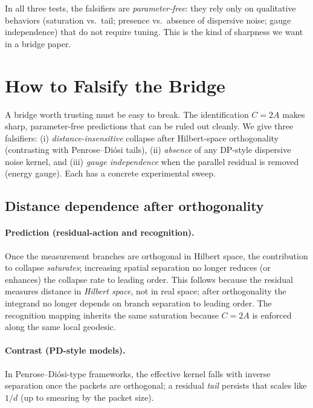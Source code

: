 \documentclass[11pt,letterpaper]{article}
\theoremstyle{definition}
\begin{document}
\medskip
In all three tests, the falsifiers are \emph{parameter‑free}: they rely only on qualitative behaviors (saturation vs.\ tail; presence vs.\ absence of dispersive noise; gauge independence) that do not require tuning. This is the kind of sharpness we want in a bridge paper. %
\section{How to Falsify the Bridge}

A bridge worth trusting must be easy to break. The identification $C=2A$ makes sharp, parameter-free predictions that can be ruled out cleanly. We give three falsifiers: (i) \emph{distance-insensitive} collapse after Hilbert-space orthogonality (contrasting with Penrose–Diósi tails), (ii) \emph{absence} of any DP-style dispersive noise kernel, and (iii) \emph{gauge independence} when the parallel residual is removed (energy gauge). Each has a concrete experimental sweep.

\subsection{Distance dependence after orthogonality}

\paragraph{Prediction (residual-action and recognition).}
Once the measurement branches are orthogonal in Hilbert space, the contribution to collapse \emph{saturates}; increasing spatial separation no longer reduces (or enhances) the collapse rate to leading order. This follows because the residual measures distance in \emph{Hilbert space}, not in real space; after orthogonality the integrand no longer depends on branch separation to leading order. The recognition mapping inherits the same saturation because $C=2A$ is enforced along the same local geodesic.

\paragraph{Contrast (PD-style models).}
In Penrose–Diósi-type frameworks, the effective kernel falls with inverse separation once the packets are orthogonal; a residual \emph{tail} persists that scales like $1/d$ (up to smearing by the packet size).
\end{document}
